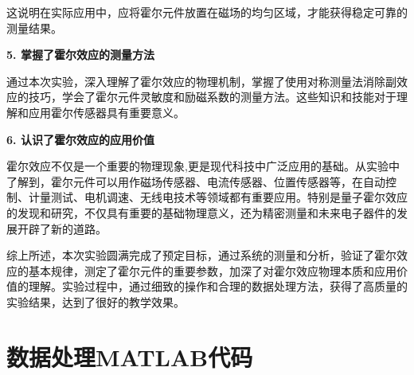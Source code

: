 ﻿\documentclass[12pt,a4paper]{article}
\begin{document}
这说明在实际应用中，应将霍尔元件放置在磁场的均匀区域，才能获得稳定可靠的测量结果。

\textbf{5. 掌握了霍尔效应的测量方法}

通过本次实验，深入理解了霍尔效应的物理机制，掌握了使用对称测量法消除副效应的技巧，学会了霍尔元件灵敏度和励磁系数的测量方法。这些知识和技能对于理解和应用霍尔传感器具有重要意义。

\textbf{6. 认识了霍尔效应的应用价值}

霍尔效应不仅是一个重要的物理现象,更是现代科技中广泛应用的基础。从实验中了解到，霍尔元件可以用作磁场传感器、电流传感器、位置传感器等，在自动控制、计量测试、电机调速、无线电技术等领域都有重要应用。特别是量子霍尔效应的发现和研究，不仅具有重要的基础物理意义，还为精密测量和未来电子器件的发展开辟了新的道路。

综上所述，本次实验圆满完成了预定目标，通过系统的测量和分析，验证了霍尔效应的基本规律，测定了霍尔元件的重要参数，加深了对霍尔效应物理本质和应用价值的理解。实验过程中，通过细致的操作和合理的数据处理方法，获得了高质量的实验结果，达到了很好的教学效果。

\clearpage
\appendix

\section{数据处理MATLAB代码}
\end{document}
